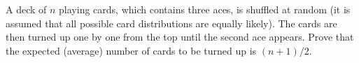 A deck of $ n$ playing cards, which contains three aces, is shuffled at random (it is assumed that all possible card distributions are equally likely). The cards are then turned up one by one from the top until the second ace appears. Prove that the expected (average) number of cards to be turned up is $ (n+1)/2$.